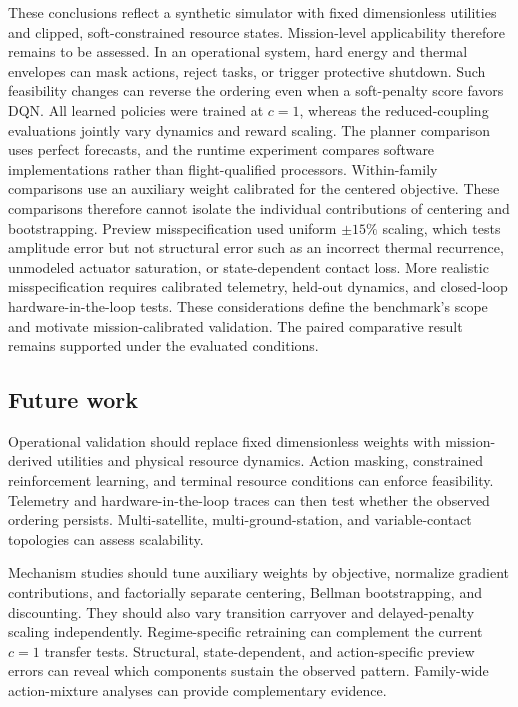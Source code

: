 \documentclass[remotesensing,article,submit,moreauthors]{Definitions/mdpi}
\newenvironment{revisedblock}{\color{red}}{}
\newenvironment{revisedblock}{}{}
\begin{document}
\begin{revisedblock}
These conclusions reflect a synthetic simulator with fixed dimensionless utilities and clipped, soft-constrained resource states. Mission-level applicability therefore remains to be assessed. In an operational system, hard energy and thermal envelopes can mask actions, reject tasks, or trigger protective shutdown. Such feasibility changes can reverse the ordering even when a soft-penalty score favors DQN. All learned policies were trained at $c=1$, whereas the reduced-coupling evaluations jointly vary dynamics and reward scaling. The planner comparison uses perfect forecasts, and the runtime experiment compares software implementations rather than flight-qualified processors. Within-family comparisons use an auxiliary weight calibrated for the centered objective. These comparisons therefore cannot isolate the individual contributions of centering and bootstrapping. Preview misspecification used uniform $\pm15\%$ scaling, which tests amplitude error but not structural error such as an incorrect thermal recurrence, unmodeled actuator saturation, or state-dependent contact loss. More realistic misspecification requires calibrated telemetry, held-out dynamics, and closed-loop hardware-in-the-loop tests. These considerations define the benchmark's scope and motivate mission-calibrated validation. The paired comparative result remains supported under the evaluated conditions.
\end{revisedblock}

\subsection{Future work}

Operational validation should replace fixed dimensionless weights with mission-derived utilities and physical resource dynamics. Action masking, constrained reinforcement learning, and terminal resource conditions can enforce feasibility. Telemetry and hardware-in-the-loop traces can then test whether the observed ordering persists. Multi-satellite, multi-ground-station, and variable-contact topologies can assess scalability.

Mechanism studies should tune auxiliary weights by objective, normalize gradient contributions, and factorially separate centering, Bellman bootstrapping, and discounting. They should also vary transition carryover and delayed-penalty scaling independently. Regime-specific retraining can complement the current $c=1$ transfer tests. Structural, state-dependent, and action-specific preview errors can reveal which components sustain the observed pattern. Family-wide action-mixture analyses can provide complementary evidence.
\end{document}
